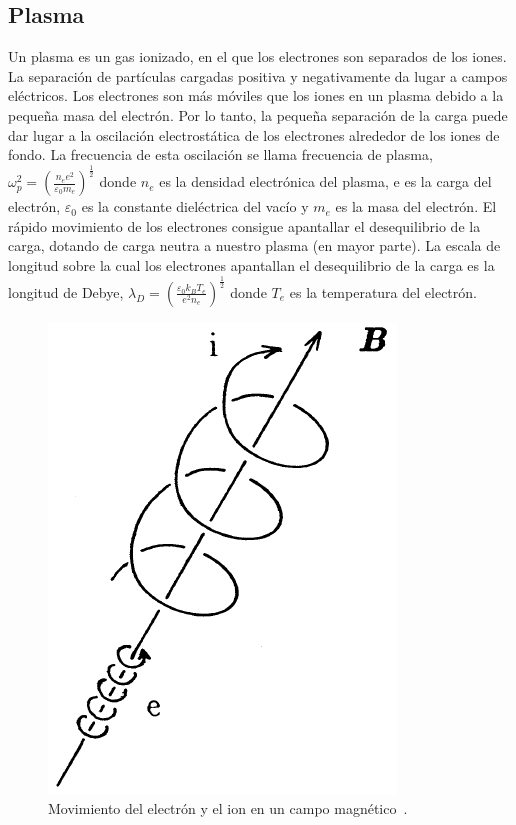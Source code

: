 \subsection{Plasma}\label{subsec:plasma}
Un plasma es un gas ionizado, en el que los electrones son separados de los iones. La separación
de partículas cargadas positiva y negativamente da lugar a campos eléctricos. Los electrones son más
móviles que los iones en un plasma debido a la pequeña masa del electrón. Por lo tanto, la pequeña separación de la carga
puede dar lugar a la oscilación electrostática de los electrones alrededor de los iones de fondo.
La frecuencia de esta oscilación se llama frecuencia de plasma, $\omega_p^2=\left(\frac{n_ee^2}{\varepsilon_0m_e}\right)^{\frac{1}{2}}$ donde $n_e$  es la densidad electrónica del plasma, e es la carga del electrón, $\varepsilon_0$ es la constante dieléctrica del vacío y $m_e$ es la masa del electrón.
El rápido movimiento de los electrones consigue apantallar el desequilibrio de la carga, dotando de carga neutra a nuestro plasma (en mayor parte). 
La escala de longitud sobre la cual los electrones apantallan el desequilibrio de la carga es la longitud de Debye, $\lambda_D=\left(\frac{\varepsilon_0k_BT_e}{e^2n_e}\right)^{\frac{1}{2}}$
donde $T_e$ es la temperatura del electrón.\par
\begin{figure}
    \centering
    \includegraphics[scale=0.5]{img/larmor.png}
    \caption[Movimiento del electrón y el ion en un campo magnético]{Movimiento del electrón y el ion en un campo magnético~\cite{Miyamoto2011}.}
    \label{fig:larmor}
\end{figure}
